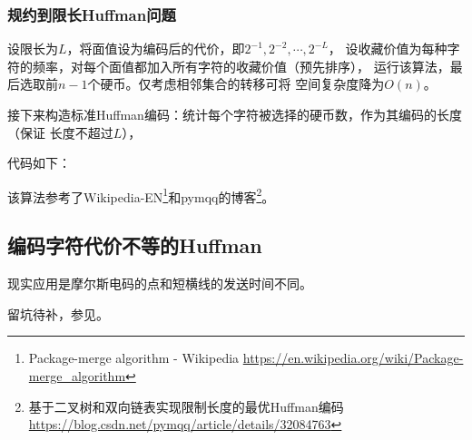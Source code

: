 \subsubsection{规约到限长Huffman问题}
设限长为$L$，将面值设为编码后的代价，即$2^{-1},2^{-2},\cdots,2^{-L}$，
设收藏价值为每种字符的频率，对每个面值都加入所有字符的收藏价值（预先排序），
运行该算法，最后选取前$n-1$个硬币。仅考虑相邻集合的转移可将
空间复杂度降为$O(n)$。

接下来构造标准Huffman编码：统计每个字符被选择的硬币数，作为其编码的长度（保证
长度不超过$L$），

代码如下：


该算法参考了Wikipedia-EN\footnote{
	Package-merge algorithm - Wikipedia
	\url{https://en.wikipedia.org/wiki/Package-merge\_algorithm}
}和pymqq的博客\footnote{
	基于二叉树和双向链表实现限制长度的最优Huffman编码
	\url{https://blog.csdn.net/pymqq/article/details/32084763}
}。
\subsection{编码字符代价不等的Huffman}
现实应用是摩尔斯电码的点和短横线的发送时间不同。

留坑待补，参见\cite{huffman}。

